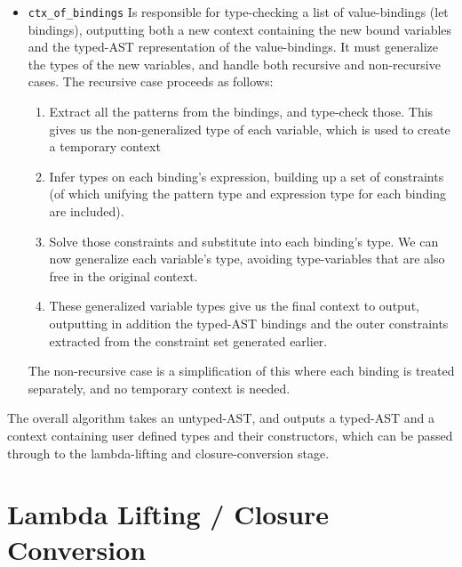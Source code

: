 \documentclass[12pt,twoside,notitlepage]{report}
\newcommand{\camlinline}{\texttt}
\newcommand{\cfbox}[2]{%
	\colorlet{currentcolor}{.}%
	{\color{#1}%
		\fbox{\color{currentcolor}#2}}%
}
\newcommand\note[1]{\noindent\cfbox{blue}{\parbox{\textwidth}{\textcolor{blue}{#1}}}}
\begin{document}
\begin{itemize}
	\item \camlinline{ctx_of_bindings} Is responsible for type-checking a list of value-bindings (let bindings), outputting both a new context containing the new bound variables and the typed-AST representation of the value-bindings. It must generalize the types of the new variables, and handle both recursive and non-recursive cases. The recursive case proceeds as follows:
	\begin{enumerate}
		\item Extract all the patterns from the bindings, and type-check those. This gives us the non-generalized type of each variable, which is used to create a temporary context
		\item Infer types on each binding's expression, building up a set of constraints (of which unifying the pattern type and expression type for each binding are included).
		\item Solve those constraints and substitute into each binding's type. We can now generalize each variable's type, avoiding type-variables that are also free in the original context.
		\item These generalized variable types give us the final context to output, outputting in addition the typed-AST bindings and the outer constraints extracted from the constraint set generated earlier.
	\end{enumerate}
	The non-recursive case is a simplification of this where each binding is treated separately, and no temporary context is needed.
\end{itemize}

The overall algorithm takes an untyped-AST, and outputs a typed-AST and a context containing user defined types and their constructors, which can be passed through to the lambda-lifting and closure-conversion stage.

\section{Lambda Lifting / Closure Conversion}
\end{document}
